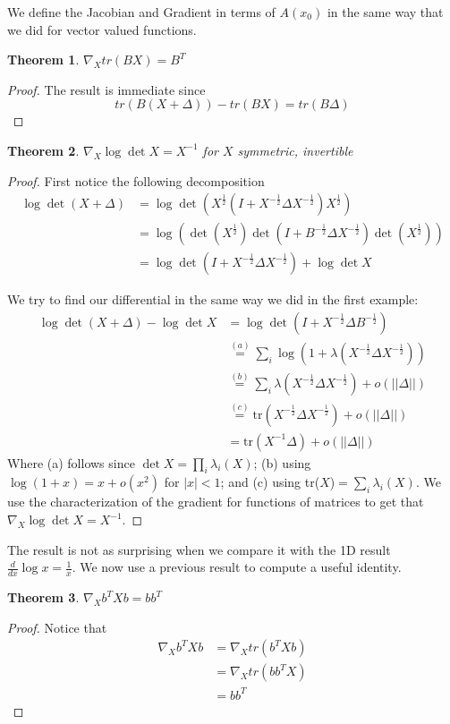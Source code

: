 \documentclass[]{article}
\theoremstyle{mattstyle}
\newtheorem{theorem}{Theorem}[section]
\theoremstyle{definition}
\begin{document}
We define the Jacobian and Gradient in terms of $A(x_0)$ in the same way that we did for vector valued functions.

\begin{theorem}
	$\nabla_{X} tr(BX) = B^T$
\end{theorem}
\begin{proof}
	The result is immediate since
	$$tr(B(X+\Delta)) - tr(BX) = tr(B\Delta)$$
\end{proof}

\begin{theorem}
	$\nabla_{X} \log \det X = X^{-1}$ for $X$ symmetric, invertible
\end{theorem}
\begin{proof}
	First notice the following decomposition
\begin{align*}
\log \det (X + \Delta) &= \log \det\left(X^{\frac{1}{2}}\left(I + X^{-\frac{1}{2}}\Delta X^{-\frac{1}{2}}\right)X^{\frac{1}{2}}\right)\\
&= \log\left(\det\left( X^{\frac{1}{2}}\right) \det\left(I + B^{-\frac{1}{2}}\Delta X^{-\frac{1}{2}}\right) \det\left(X^{\frac{1}{2}}\right) \right)\\
&=\log\det\left(I + X^{-\frac{1}{2}}\Delta X^{-\frac{1}{2}}\right)+\log\det X
\end{align*}

We try to find our differential in the same way we did in the first example:
\begin{align*}
\log \det (X + \Delta) - \log\det X &= \log\det\left(I + X^{-\frac{1}{2}}\Delta B^{-\frac{1}{2}}\right)\\
&\overset{(a)}{=} \sum_{i} \log\left(1 + \lambda\left(X^{-\frac{1}{2}}\Delta X^{-\frac{1}{2}}\right)\right)\\
&\overset{(b)}{=} \sum_{i}\lambda\left(X^{-\frac{1}{2}}\Delta X^{-\frac{1}{2}}\right) + o(||\Delta||)\\
&\overset{(c)}{=} \text{tr}\left(X^{-\frac{1}{2}}\Delta X^{-\frac{1}{2}}\right) + o(||\Delta||)\\
&= \text{tr}(X^{-1}\Delta) + o(||\Delta||)
\end{align*}
Where (a) follows since $\det X = \prod_i \lambda_i(X)$; (b) using $\log(1+x)=x+o(x^2)$ for $|x|<1$; and (c) using tr($X$)$=\sum_i \lambda_i(X)$. 
We use the characterization of the gradient for functions of matrices to get that $\nabla_X \log\det X = X^{-1}$.
\end{proof}
The result is not as surprising when we compare it with the 1D result $\frac{d}{dx}\log x = \frac{1}{x}$. We now use a previous result to compute a useful identity.
\begin{theorem}
	$\nabla_{X} b^TXb = bb^T$
\end{theorem}
\begin{proof}
	Notice that
	\begin{align*}
	\nabla_{X} b^TXb &= \nabla_{X} tr(b^TXb)\\
	&= \nabla_{X} tr(bb^TX)\\
	&= bb^T
	\end{align*}
\end{proof}
\end{document}
